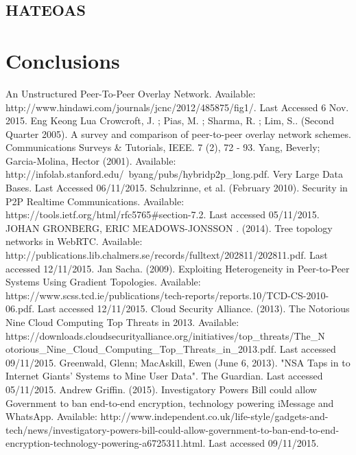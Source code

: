 \documentclass[]{report}
\begin{document}
			\subsection{HATEOAS}
		\section{Conclusions}

					
	\begin{thebibliography}{20}
		An Unstructured Peer-To-Peer Overlay Network. Available: http://www.hindawi.com/journals/jcnc/2012/485875/fig1/. Last Accessed 6 Nov. 2015.
		Eng Keong Lua Crowcroft, J. ; Pias, M. ; Sharma, R. ; Lim, S.. (Second Quarter 2005). A survey and comparison of peer-to-peer overlay network schemes. Communications Surveys \& Tutorials, IEEE. 7 (2), 72 - 93.
		Yang, Beverly; Garcia-Molina, Hector (2001). Available: http://infolab.stanford.edu/~byang/pubs/hybridp2p\_long.pdf. Very Large Data Bases. Last Accessed 06/11/2015.
		Schulzrinne, et al. (February 2010). Security in P2P Realtime Communications. Available: https://tools.ietf.org/html/rfc5765\#section-7.2. Last accessed 05/11/2015.
		JOHAN GRONBERG, ERIC MEADOWS-JONSSON . (2014). Tree topology networks in WebRTC. Available: http://publications.lib.chalmers.se/records/fulltext/202811/202811.pdf. Last accessed 12/11/2015.
		Jan Sacha. (2009). Exploiting Heterogeneity in Peer-to-Peer Systems Using Gradient Topologies. Available: https://www.scss.tcd.ie/publications/tech-reports/reports.10/TCD-CS-2010-06.pdf. Last accessed 12/11/2015.
		Cloud Security Alliance. (2013). The Notorious Nine Cloud Computing Top Threats in 2013. Available: https://downloads.cloudsecurityalliance.org/initiatives/top\_threats/The\_N\\otorious\_Nine\_Cloud\_Computing\_Top\_Threats\_in\_2013.pdf. Last accessed 09/11/2015.
		Greenwald, Glenn; MacAskill, Ewen (June 6, 2013). "NSA Taps in to Internet Giants' Systems to Mine User Data". The Guardian.  Last accessed 05/11/2015.
		Andrew Griffin. (2015). Investigatory Powers Bill could allow Government to ban end-to-end encryption, technology powering iMessage and WhatsApp. Available: http://www.independent.co.uk/life-style/gadgets-and-tech/news/investigatory-powers-bill-could-allow-government-to-ban-end-to-end-encryption-technology-powering-a6725311.html. Last accessed 09/11/2015.

\end{thebibliography}
\end{document}
